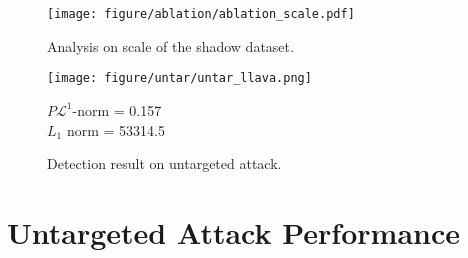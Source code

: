 \begin{figure}[h]
    \begin{minipage}[c]{0.6\linewidth}
        \texttt{[image: figure/ablation/ablation\_scale.pdf]}
        \caption{Analysis on scale of the shadow dataset.}
        \label{fig:abl_images}
    \end{minipage}
    \begin{minipage}[c]{0.35\linewidth}
        \texttt{[image: figure/untar/untar\_llava.png]}
        \parbox{\linewidth}{\centering \scriptsize $P\mathcal{L}^1$-norm = 0.157 \\ $L_1$ norm = 53314.5}
        \caption{Detection result on untargeted attack.}
        \label{fig:untar}
    \end{minipage}
\end{figure}

\section{Untargeted Attack Performance}
\label{appendix:untar_attack}
\begin{table}[h]
    \centering
    \caption{Performance of LLaVA built on clean and backdoored encoders across five benchmarks. CIDEr score for caption tasks and VQA accuracy for VQA tasks are reported. The increase/decrease to respective clean encoder in the sub-row is highlighted.}
    \label{tab:untar}
\end{table}


